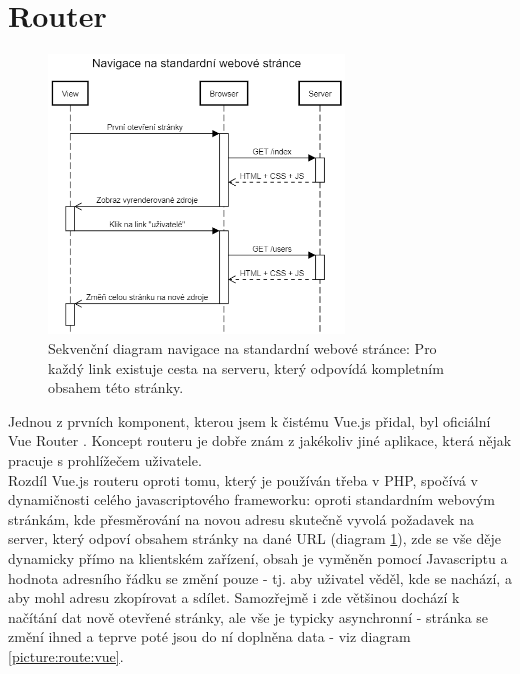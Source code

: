 \section{Router}

\begin{figure}[h]
\includegraphics[width=0.7\textwidth]{../png/diagrams/sequence-http-navigate.png}
\caption[Sekvenční diagram navigace na standardní webové stránce]{Sekvenční diagram navigace na standardní webové stránce: Pro každý link existuje cesta na serveru, který odpovídá kompletním obsahem této stránky.} \label{picture:route:http}
\end{figure}

Jednou z prvních komponent, kterou jsem k čistému Vue.js přidal, byl oficiální Vue Router \cite{vue-router}. Koncept routeru je dobře znám z jakékoliv jiné aplikace, která nějak pracuje s prohlížečem uživatele.\\
Rozdíl Vue.js routeru oproti tomu, který je používán třeba v PHP, spočívá v dynamičnosti celého javascriptového frameworku: oproti standardním webovým stránkám, kde přesměrování na novou adresu skutečně vyvolá požadavek na server, který odpoví obsahem stránky na dané URL (diagram \ref{picture:route:http}), zde se vše děje dynamicky přímo na klientském zařízení, obsah je vyměněn pomocí Javascriptu a hodnota adresního řádku se změní pouze  - tj. aby uživatel věděl, kde se nachází, a aby mohl adresu zkopírovat a sdílet. Samozřejmě i zde většinou dochází k načítání dat nově otevřené stránky, ale vše je typicky asynchronní - stránka se změní ihned a teprve poté jsou do ní doplněna data - viz diagram \ref{picture:route:vue}.

